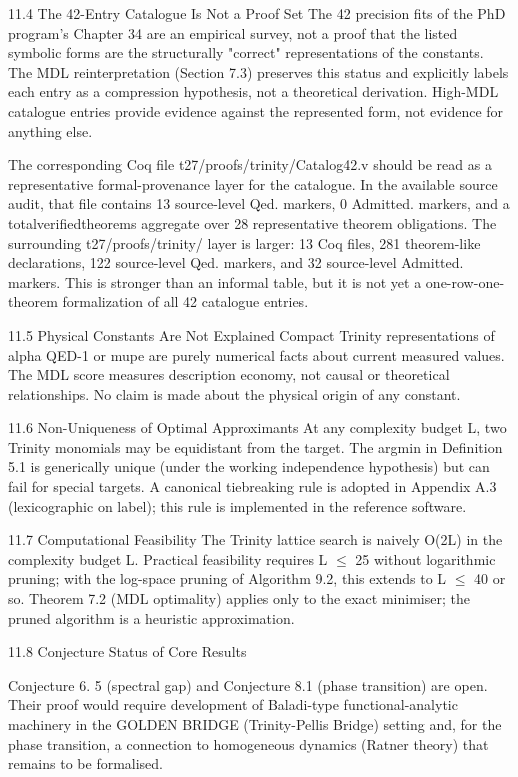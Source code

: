  11.4 The 42-Entry Catalogue Is Not a Proof Set
  The 42 precision fits of the PhD program's Chapter 34 are an empirical survey, not a
  proof that the listed symbolic forms are the structurally "correct" representations of the
  constants. The MDL reinterpretation (Section 7.3) preserves this status and explicitly
  labels each entry as a compression hypothesis, not a theoretical derivation. High-MDL
  catalogue entries provide evidence against the represented form, not evidence for
  anything else.

  The corresponding Coq file t27/proofs/trinity/Catalog42.v should be read as a
  representative formal-provenance layer for the catalogue. In the available source audit,
  that file contains 13 source-level Qed. markers, 0 Admitted. markers, and a
  totalverifiedtheorems aggregate over 28 representative theorem obligations. The
  surrounding t27/proofs/trinity/ layer is larger: 13 Coq files, 281 theorem-like
  declarations, 122 source-level Qed. markers, and 32 source-level Admitted. markers.
  This is stronger than an informal table, but it is not yet a one-row-one-theorem
  formalization of all 42 catalogue entries.

  11.5 Physical Constants Are Not Explained
  Compact Trinity representations of alpha QED-1 or mupe are purely numerical facts
  about current measured values. The MDL score measures description economy, not
  causal or theoretical relationships. No claim is made about the physical origin of any
  constant.

  11.6 Non-Uniqueness of Optimal Approximants
  At any complexity budget L, two Trinity monomials may be equidistant from the target.
  The argmin in Definition 5.1 is generically unique (under the working independence
  hypothesis) but can fail for special targets. A canonical tiebreaking rule is adopted in
  Appendix A.3 (lexicographic on label); this rule is implemented in the reference
  software.

  11.7 Computational Feasibility
  The Trinity lattice search is naively O(2L) in the complexity budget L. Practical
  feasibility requires L $\leq$ 25 without logarithmic pruning; with the log-space pruning of
  Algorithm 9.2, this extends to L $\leq$ 40 or so. Theorem 7.2 (MDL optimality) applies only
  to the exact minimiser; the pruned algorithm is a heuristic approximation.

  11.8 Conjecture Status of Core Results

        Conjecture 6. 5 (spectral gap) and Conjecture 8.1 (phase transition) are open.
        Their proof would require development of Baladi-type functional-analytic
        machinery in the GOLDEN BRIDGE (Trinity-Pellis Bridge) setting and, for the phase transition, a connection
        to homogeneous dynamics (Ratner theory) that remains to be formalised.

